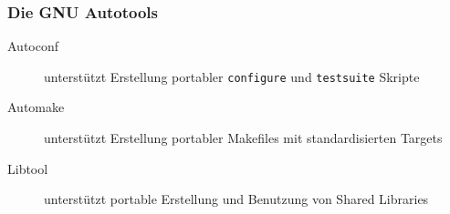 \begin{frame}
	\frametitle{Die GNU Autotools}
	\begin{description}
		\item[Autoconf]	unterstützt Erstellung portabler \texttt{configure} und \texttt{testsuite} Skripte
		\item[Automake]	unterstützt Erstellung portabler Makefiles mit standardisierten Targets
		\item[Libtool] 	unterstützt portable Erstellung und Benutzung von Shared Libraries
	\end{description}
\end{frame}
%
